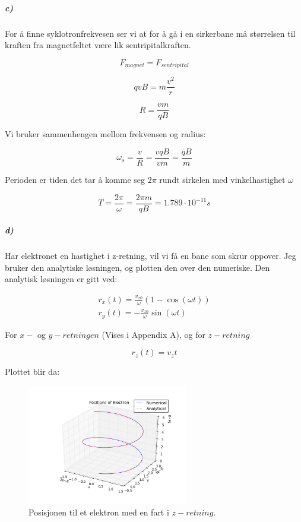 \documentclass[a4paper,norsk, 10pt]{article}
\begin{document}
\newpage

\subparagraph*{c)}
For å finne syklotronfrekvesen ser vi at for å gå i en sirkerbane må størrelsen til kraften fra magnetfeltet være lik sentripitalkraften.

$$
F_{magnet} = F_{sentripital}
$$

\begin{equation}
qvB = m\frac{v^2}{r}
\end{equation}


\begin{equation}
R = \frac{vm}{qB}
\end{equation}

Vi bruker sammenhengen mellom frekvensen og radius:

\begin{equation}
\omega_s = \frac{v}{R} = \frac{vqB}{vm} = \frac{qB}{m}
\end{equation}


Perioden er tiden det tar å komme seg $2\pi$ rundt sirkelen med vinkelhastighet $\omega$

\begin{equation}
T = \frac{2\pi}{\omega} = \frac{2\pi m}{qB} = 1.789\cdot 10^{-11} s
\end{equation} 

\subparagraph*{d)}

Har elektronet en hastighet i z-retning, vil vi få en bane som skrur oppover.
Jeg bruker den analytiske løsningen, og plotten den over den numeriske. Den analytisk løsningen er gitt ved:

\begin{equation}
\begin{split}
r_x(t) = \frac{v_{x0}}{\omega}(1-\cos(\omega t))
\\
r_y(t) = -\frac{v_{x0}}{\omega}\sin(\omega t)
\end{split}
\end{equation}

For $x-$ og $y-retningen$ (Vises i Appendix A), og for $z-retning$

\begin{equation}
r_z(t) = v_{z}t
\end{equation}

Plottet blir da:

\begin{figure}[H]
\begin{center}
\includegraphics[width = 70mm]{opp2dPos3dwAnalytic.png}
\caption{Posisjonen til et elektron med en fart i $z-retning$.}
\end{center}
\end{figure}
\end{document}
